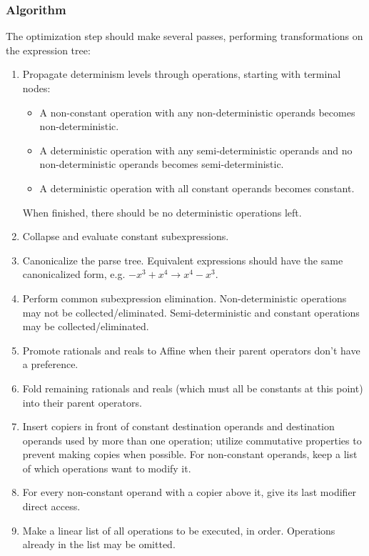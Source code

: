 \documentclass{article}
\begin{document}
\subsubsection{Algorithm}
The optimization step should make several passes, performing transformations on the expression tree:
\begin{enumerate}
  \item Propagate determinism levels through operations, starting with terminal nodes:
  \begin{itemize}
    \item A non-constant operation with any non-deterministic operands becomes non-deterministic.
    \item A deterministic operation with any semi-deterministic operands and no non-deterministic operands becomes semi-deterministic.
    \item A deterministic operation with all constant operands becomes constant.
  \end{itemize}
  When finished, there should be no deterministic operations left.

  \item Collapse and evaluate constant subexpressions.

  \item Canonicalize the parse tree.
  Equivalent expressions should have the same canonicalized form, e.g\@. $-x^3 + x^4 \to x^4 - x^3$.

  \item Perform common subexpression elimination.
  Non-deterministic operations may not be collected/eliminated.
  Semi-deterministic and constant operations may be collected/eliminated.

  \item Promote rationals and reals to Affine when their parent
  operators don't have a preference.

  \item Fold remaining rationals and reals (which must all be constants
  at this point) into their parent operators.

  \item Insert copiers in front of constant destination operands and destination operands used by more than one operation; utilize commutative properties to prevent making copies when possible.
  For non-constant operands, keep a list of which operations want to modify it.

  \item For every non-constant operand with a copier above it, give its last modifier direct access.

  \item Make a linear list of all operations to be executed, in order.
  Operations already in the list may be omitted.
\end{enumerate}
\end{document}

